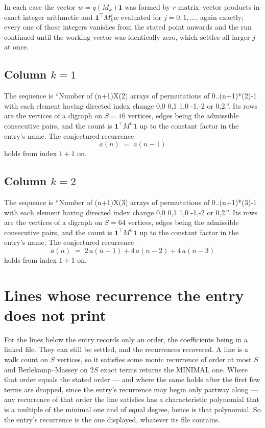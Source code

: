 \documentclass[11pt,a4paper]{article}
\theoremstyle{plain}
\theoremstyle{definition}
\begin{document}
In each case the vector $w=q(M_k)\mathbf{1}$ was formed by $r$ matrix--vector products in
exact integer arithmetic and $\mathbf{1}^{\!\top}M_k^{j}w$ evaluated for $j=0,1,\dots$,
again exactly; every one of those integers vanishes from the stated point onwards and the run
continued until the working vector was identically zero, which settles all larger $j$ at once.

\subsection*{Column $k$$=1$}
The sequence is ``Number of (n+1)X(2) arrays of permutations of 0..(n+1)*(2)-1 with each element having directed index change 0,0 0,1 1,0 -1,-2 or 0,2.''. Its rows are the vertices of a digraph on
$S=16$ vertices, edges being the admissible consecutive pairs, and the count is
$\mathbf{1}^{\!\top}M^{n}\mathbf{1}$ up to the constant factor in the entry's name.
The conjectured recurrence
\[
a(n)\;=\;a(n-1)
\]
holds from index $1+1$ on.

\subsection*{Column $k$$=2$}
The sequence is ``Number of (n+1)X(3) arrays of permutations of 0..(n+1)*(3)-1 with each element having directed index change 0,0 0,1 1,0 -1,-2 or 0,2.''. Its rows are the vertices of a digraph on
$S=64$ vertices, edges being the admissible consecutive pairs, and the count is
$\mathbf{1}^{\!\top}M^{n}\mathbf{1}$ up to the constant factor in the entry's name.
The conjectured recurrence
\[
a(n)\;=\;2\,a(n-1) + 4\,a(n-2) + 4\,a(n-3)
\]
holds from index $1+1$ on.


\section{Lines whose recurrence the entry does not print}

For the lines below the entry records only an order, the coefficients being in a linked file.
They can still be settled, and the recurrences recovered. A line is a walk count on $S$
vertices, so it satisfies some monic recurrence of order at most $S$ and Berlekamp--Massey on
$2S$ exact terms returns the MINIMAL one. Where that order equals the stated order --- and
where the same holds after the first few terms are dropped, since the entry's recurrence may
begin only partway along --- any recurrence of that order the line satisfies has a
characteristic polynomial that is a multiple of the minimal one and of equal degree, hence is
that polynomial. So the entry's recurrence is the one displayed, whatever its file contains.
\end{document}
